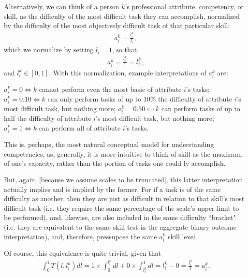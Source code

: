 \documentclass[hidelinks, nonatbib]{elsarticle}
\begin{document}
\begin{definition}[Skill]
\label{skl_difficulty}
    Alternatively, we can think of a person $k$'s professional attribute, competency, or skill, as the difficulty of the most difficult task they can accomplish, normalized by the difficulty of the most objectively difficult task of that particular skill:
    \begin{gather}
        a_{i}^{k} =
        \frac{
            l_{i}^{k}
        }{
            l_{i}
        }
        ,
    \end{gather}
    which we normalize by setting $l_{i} = 1$, so that
    \begin{gather}
        a_{i}^{k} =
        \frac{
            l_{i}^{k}
        }{
            1
        }
        =
        l_{i}^{k}
        ,
    \end{gather}
    and $l_{i}^{k} \in [0,1]$. With this normalization, example interpretations of $a_{i}^{k}$ are:
    
        $a_{i}^{k} = 0 \iff k$ cannot perform even the most basic of attribute $i$'s tasks;
        $a_{i}^{k} = 0.10 \iff k$ can only perform tasks of up to 10\% the difficulty of attribute $i$'s most difficult task, but nothing more;
        $a_{i}^{k} = 0.50 \iff k$ can perform tasks of up to half the difficulty of attribute $i$'s most difficult task, but nothing more;
        $a_{i}^{k} = 1 \iff k$ can perform all of attribute $i$'s tasks.
    

    This is, perhaps, the most natural conceptual model for understanding
    competencies, as, generally, it is more intuitive to think of skill as the
    maximum of one's capacity, rather than the portion of tasks one could
    ly accomplish.

    But, again, [because we assume scales to be truncated], this latter interpretation
    actually implies and is implied by the former. For if a task is of the same
    difficulty as another, then they are just as difficult in relation to that
    skill's most difficult task (i.e. they require the same percentage of the
    scale's upper limit to be performed), and, likewise, are also included in the
    same difficulty ``bracket" (i.e. they are equivalent to the same skill test in
    the aggregate binary outcome interpretation), and, therefore, pressupose the
    same $a_{i}^{k}$ skill level.

    Of course, this equivalence is quite trivial, given that
    \begin{gather}
        \int_{0}^{1}{
        T(l, l_{i}^{k})
        dl
        }
        =
        1 \times \int_{0}^{l_{i}^{k}}{dl} +
        0 \times \int_{l_{i}^{k}}^{1}{dl}
        =
        l_{i}^{k} - 0
        =
        \frac{l_{i}^{k}}{1}
        =
        a_{i}^{k}
        .
    \end{gather}


\end{definition}
\end{document}
